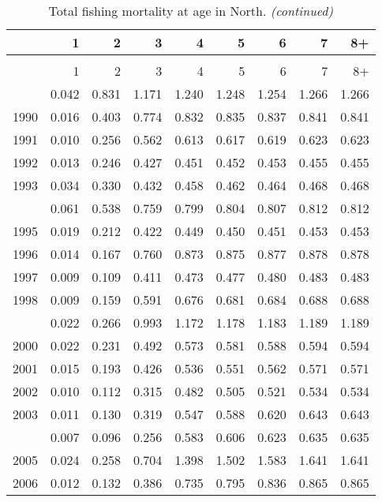 \documentclass[
]{article}
\begin{document}
\begin{longtable}[t]{lrrrrrrrr}
\caption{\label{tab:North-region-FAA-table}Total fishing mortality at age in North.}\\
\toprule
  & 1 & 2 & 3 & 4 & 5 & 6 & 7 & 8+\\
\midrule
\endfirsthead
\caption[]{Total fishing mortality at age in North. \textit{(continued)}}\\
\toprule
  & 1 & 2 & 3 & 4 & 5 & 6 & 7 & 8+\\
\midrule
\endhead

\endfoot
\bottomrule
\endlastfoot
1989 & 0.042 & 0.831 & 1.171 & 1.240 & 1.248 & 1.254 & 1.266 & 1.266\\
1990 & 0.016 & 0.403 & 0.774 & 0.832 & 0.835 & 0.837 & 0.841 & 0.841\\
1991 & 0.010 & 0.256 & 0.562 & 0.613 & 0.617 & 0.619 & 0.623 & 0.623\\
1992 & 0.013 & 0.246 & 0.427 & 0.451 & 0.452 & 0.453 & 0.455 & 0.455\\
1993 & 0.034 & 0.330 & 0.432 & 0.458 & 0.462 & 0.464 & 0.468 & 0.468\\
\addlinespace
1994 & 0.061 & 0.538 & 0.759 & 0.799 & 0.804 & 0.807 & 0.812 & 0.812\\
1995 & 0.019 & 0.212 & 0.422 & 0.449 & 0.450 & 0.451 & 0.453 & 0.453\\
1996 & 0.014 & 0.167 & 0.760 & 0.873 & 0.875 & 0.877 & 0.878 & 0.878\\
1997 & 0.009 & 0.109 & 0.411 & 0.473 & 0.477 & 0.480 & 0.483 & 0.483\\
1998 & 0.009 & 0.159 & 0.591 & 0.676 & 0.681 & 0.684 & 0.688 & 0.688\\
\addlinespace
1999 & 0.022 & 0.266 & 0.993 & 1.172 & 1.178 & 1.183 & 1.189 & 1.189\\
2000 & 0.022 & 0.231 & 0.492 & 0.573 & 0.581 & 0.588 & 0.594 & 0.594\\
2001 & 0.015 & 0.193 & 0.426 & 0.536 & 0.551 & 0.562 & 0.571 & 0.571\\
2002 & 0.010 & 0.112 & 0.315 & 0.482 & 0.505 & 0.521 & 0.534 & 0.534\\
2003 & 0.011 & 0.130 & 0.319 & 0.547 & 0.588 & 0.620 & 0.643 & 0.643\\
\addlinespace
2004 & 0.007 & 0.096 & 0.256 & 0.583 & 0.606 & 0.623 & 0.635 & 0.635\\
2005 & 0.024 & 0.258 & 0.704 & 1.398 & 1.502 & 1.583 & 1.641 & 1.641\\
2006 & 0.012 & 0.132 & 0.386 & 0.735 & 0.795 & 0.836 & 0.865 & 0.865\\

\end{longtable}
\end{document}
